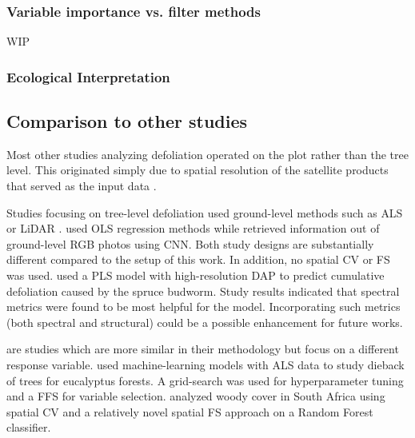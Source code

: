 \documentclass[letterpaper, journal]{IEEEtran}
\begin{document}
\subsubsection{Variable importance vs. filter methods}

WIP

\subsubsection{Ecological Interpretation}


\subsection{Comparison to other studies}

\noindent Most other studies analyzing defoliation operated on the plot rather than the tree level.
This originated simply due to spatial resolution of the satellite products that served as the input data \cite{townsend2012, debeurs2008a, rengarajan2016}.

Studies focusing on tree-level defoliation used ground-level methods such as \ac{ALS} or \ac{LiDAR} \cite{meng2018, kalin2019}.
\cite{meng2018} used \ac{OLS} regression methods while \cite{kalin2019} retrieved information out of ground-level RGB photos using \ac{CNN}.
Both study designs are substantially different compared to the setup of this work.
In addition, no spatial \ac{CV} or \ac{FS} was used.
\cite{goodbody2018} used a \ac{PLS} model with high-resolution \ac{DAP} to predict cumulative defoliation caused by the spruce budworm.
Study results indicated that spectral metrics were found to be most helpful for the model.
Incorporating such metrics (both spectral and structural) could be a possible enhancement for future works.

\cite{shendryk2016, ludwig2019} are studies which are more similar in their methodology but focus on a different response variable.
\cite{shendryk2016} used machine-learning models with \ac{ALS} data to study dieback of trees for eucalyptus forests.
A grid-search was used for hyperparameter tuning and a \ac{FFS} for variable selection.
\cite{ludwig2019} analyzed woody cover in South Africa using spatial \ac{CV} and a relatively novel spatial \ac{FS} approach \cite{meyer2018} on a Random Forest classifier.
\end{document}
